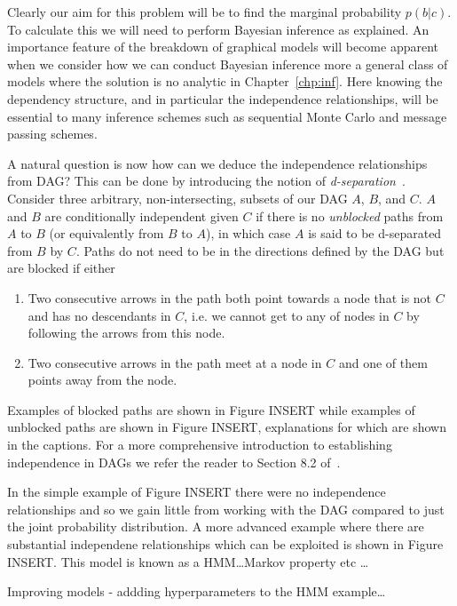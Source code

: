 Clearly our aim for this problem will be to find the marginal probability $p(b|c)$.  To calculate this
we will need to perform Bayesian inference as explained.
An importance feature of the breakdown of graphical models will become apparent when we
consider how we can conduct Bayesian inference more a general class of 
models where the solution is no analytic in Chapter~\ref{chp:inf}.  Here knowing the dependency
structure, and in particular the independence relationships, will be essential to many inference 
schemes such as sequential Monte Carlo and message
passing schemes.

A natural question is now how can we deduce the independence relationships from DAG?
This can be done by introducing the notion of \emph{d-separation}~\citep{pearl2014probabilistic}.
Consider three arbitrary, non-intersecting, subsets of our DAG $A$, $B$, and $C$.  $A$ and $B$
are conditionally independent given $C$ if there is no \emph{unblocked} paths from $A$ to $B$
(or equivalently from $B$ to $A$), in which case $A$ is said to be d-separated from $B$ by $C$.  
Paths do not need to be in the directions defined by the DAG but are blocked if either
\begin{enumerate}
	\item Two consecutive arrows in the path both point towards a node that is not $C$ and
	has no descendants in $C$, i.e. we cannot get to any of nodes in $C$ by following the arrows
	from this node.
	\item Two consecutive arrows in the path meet at a node in $C$ and one of them
	points away from the node.
\end{enumerate}
Examples of blocked paths are shown in Figure INSERT while examples of unblocked paths
are shown in Figure INSERT, explanations for which are shown in the captions.
For a more comprehensive introduction to establishing independence in DAGs we
refer the reader to Section 8.2 of~\cite{bishop2006pattern}.

In the simple example of Figure INSERT there were no independence relationships and so
we gain little from working with the DAG compared to just the joint probability distribution.
A more advanced example where there are substantial independene relationships which can
be exploited is shown in Figure INSERT.  This model is known as a HMM\dots Markov property
etc \dots

Improving models - addding hyperparameters to the HMM example\dots
